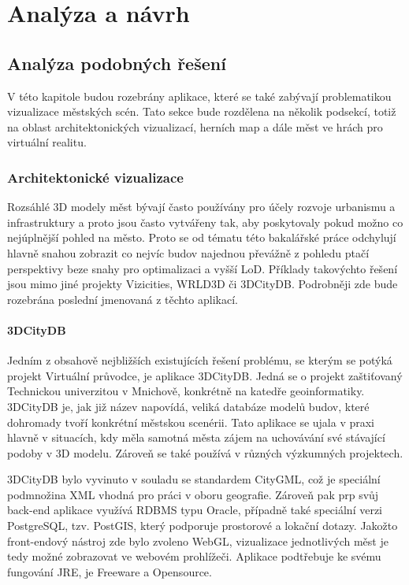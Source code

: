 \documentclass[thesis=B,czech]{FITthesis}[2012/06/26]
\begin{document}
\chapter{Analýza a návrh}
	\section{Analýza podobných řešení}
	
		V této kapitole budou rozebrány aplikace, které se také zabývají problematikou vizualizace městských scén. Tato sekce bude rozdělena na několik podsekcí, totiž na oblast architektonických vizualizací, herních map a dále měst ve hrách pro virtuální realitu.

		\subsection{Architektonické vizualizace}

			Rozsáhlé 3D modely měst bývají často používány pro účely rozvoje urbanismu a infrastruktury a proto jsou často vytvářeny tak, aby poskytovaly pokud možno co nejúplnější pohled na město. Proto se od tématu této bakalářské práce odchylují hlavně snahou zobrazit co nejvíc budov najednou převážně z pohledu ptačí perspektivy beze snahy pro optimalizaci a vyšší LoD. Příklady takovýchto řešení jsou mimo jiné projekty Vizicities, WRLD3D či 3DCityDB. Podrobněji zde bude rozebrána poslední jmenovaná z těchto aplikací.
			\subsubsection{3DCityDB}
			
			Jedním z obsahově nejbližších existujících řešení problému, se kterým se potýká projekt Virtuální průvodce, je aplikace 3DCityDB. Jedná se o projekt zaštiťovaný Technickou univerzitou v Mnichově, konkrétně na katedře geoinformatiky. 3DCityDB je, jak již název napovídá, veliká databáze modelů budov, které dohromady tvoří konkrétní městskou scenérii. Tato aplikace se ujala v praxi hlavně v situacích, kdy měla samotná města zájem na uchovávání své stávající podoby v 3D modelu. Zároveň se také používá v různých výzkumných projektech.


3DCityDB bylo vyvinuto v souladu se standardem CityGML, což je speciální podmnožina XML vhodná pro práci v oboru geografie. Zároveň pak prp svůj back-end aplikace využívá RDBMS typu Oracle, případně také speciální verzi PostgreSQL, tzv. PostGIS, který podporuje prostorové a lokační dotazy. Jakožto front-endový nástroj zde bylo zvoleno WebGL, vizualizace jednotlivých měst je tedy možné zobrazovat ve webovém prohlížeči. Aplikace podtřebuje ke svému fungování JRE, je Freeware a Opensource.
\end{document}
